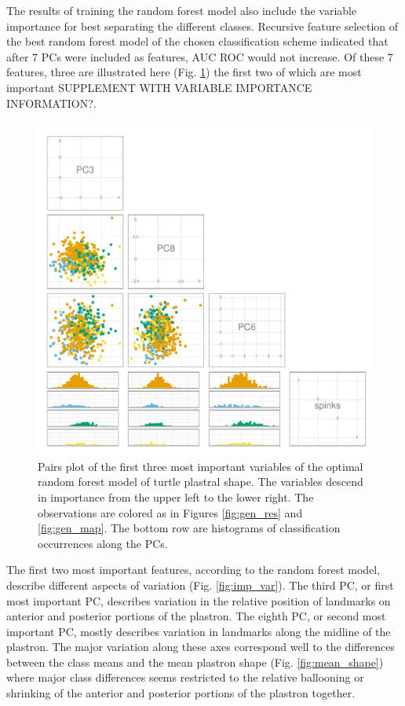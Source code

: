 \documentclass[12pt,letterpaper]{article}\usepackage{graphicx, color}
\begin{document}
The results of training the random forest model also include the variable importance for best separating the different classes. Recursive feature selection of the best random forest model of the chosen classification scheme indicated that after 7 PCs were included as features, AUC ROC would not increase. Of these 7 features, three are illustrated here (Fig. \ref{fig:imp_pc}) the first two of which are most important SUPPLEMENT WITH VARIABLE IMPORTANCE INFORMATION?. 

\begin{figure}[ht]
  \centering
  \includegraphics[width = \textwidth]{figure/pca_imp}
  \caption{Pairs plot of the first three most important variables of the optimal random forest model of turtle plastral shape. The variables descend in importance from the upper left to the lower right. The observations are colored as in Figures \ref{fig:gen_res} and \ref{fig:gen_map}.  The bottom row are histograms of classification occurrences along the PCs.}
  \label{fig:imp_pc}
\end{figure}

The first two most important features, according to the random forest model, describe different aspects of variation (Fig. \ref{fig:imp_var}). The third PC, or first most important PC, describes variation in the relative position of landmarks on anterior and posterior portions of the plastron. The eighth PC, or second most important PC, mostly describes variation in landmarks along the midline of the plastron. The major variation along these axes correspond well to the differences between the class means and the mean plastron shape (Fig. \ref{fig:mean_shape}) where major class differences seems restricted to the relative ballooning or shrinking of the anterior and posterior portions of the plastron together.
\end{document}
